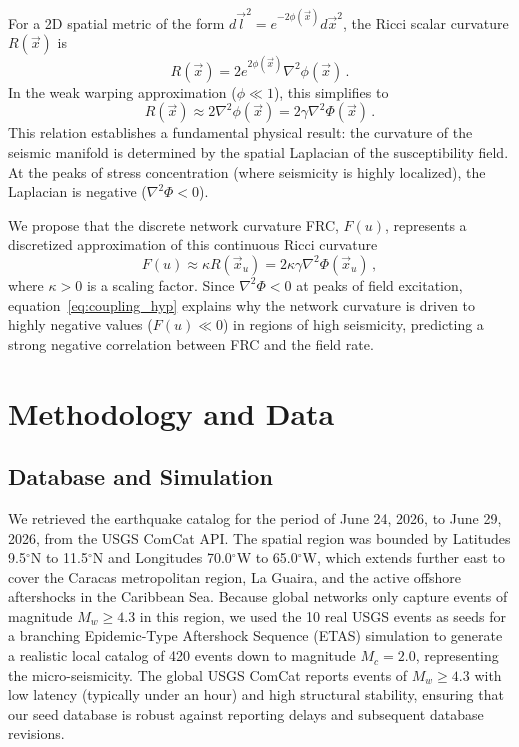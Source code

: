 \documentclass[twocolumn,amsmath,amssymb,aps,pre,superscriptaddress]{revtex4-1}
\begin{document}
For a 2D spatial metric of the form $d\vec{l}^2 = e^{-2\phi(\vec{x})} d\vec{x}^2$, the Ricci scalar curvature $R(\vec{x})$ is
\begin{equation}
R(\vec{x}) = 2 e^{2\phi(\vec{x})} \nabla^2 \phi(\vec{x}) \,.
\label{eq:ricci_exact}
\end{equation}
In the weak warping approximation ($\phi \ll 1$), this simplifies to
\begin{equation}
R(\vec{x}) \approx 2 \nabla^2 \phi(\vec{x}) = 2\gamma \nabla^2 \Phi(\vec{x}) \,.
\label{eq:ricci_approx}
\end{equation}
This relation establishes a fundamental physical result: the curvature of the seismic manifold is determined by the spatial Laplacian of the susceptibility field. At the peaks of stress concentration (where seismicity is highly localized), the Laplacian is negative ($\nabla^2\Phi < 0$).

We propose that the discrete network curvature FRC, $F(u)$, represents a discretized approximation of this continuous Ricci curvature
\begin{equation}
F(u) \approx \kappa R(\vec{x}_u) = 2 \kappa \gamma \nabla^2 \Phi(\vec{x}_u) \,,
\label{eq:coupling_hyp}
\end{equation}
where $\kappa > 0$ is a scaling factor. Since $\nabla^2\Phi < 0$ at peaks of field excitation, equation~\eqref{eq:coupling_hyp} explains why the network curvature is driven to highly negative values ($F(u) \ll 0$) in regions of high seismicity, predicting a strong negative correlation between FRC and the field rate.

\section{Methodology and Data}

\subsection{Database and Simulation}
We retrieved the earthquake catalog for the period of June 24, 2026, to June 29, 2026, from the USGS ComCat API. The spatial region was bounded by Latitudes 9.5$^\circ$N to 11.5$^\circ$N and Longitudes 70.0$^\circ$W to 65.0$^\circ$W, which extends further east to cover the Caracas metropolitan region, La Guaira, and the active offshore aftershocks in the Caribbean Sea. Because global networks only capture events of magnitude $M_w \ge 4.3$ in this region, we used the 10 real USGS events as seeds for a branching Epidemic-Type Aftershock Sequence (ETAS) simulation \cite{Ogata1988, Helmstetter2002Subcritical} to generate a realistic local catalog of 420 events down to magnitude $M_c = 2.0$, representing the micro-seismicity. The global USGS ComCat reports events of $M_w \ge 4.3$ with low latency (typically under an hour) and high structural stability, ensuring that our seed database is robust against reporting delays and subsequent database revisions.
\end{document}
